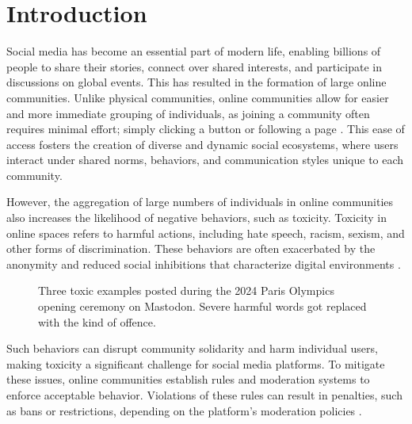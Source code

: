 \chapter{Introduction}\label{introduction}

Social media has become an essential part of modern life, enabling billions of people to share their stories, connect over shared interests, and participate in discussions on global events. This has resulted in the formation of large online communities. Unlike physical communities, online communities allow for easier and more immediate grouping of individuals, as joining a community often requires minimal effort; simply clicking a button or following a page \cite{ellison:2007}. This ease of access fosters the creation of diverse and dynamic social ecosystems, where users interact under shared norms, behaviors, and communication styles unique to each community.

However, the aggregation of large numbers of individuals in online communities also increases the likelihood of negative behaviors, such as toxicity. Toxicity in online spaces refers to harmful actions, including hate speech, racism, sexism, and other forms of discrimination. These behaviors are often exacerbated by the anonymity and reduced social inhibitions that characterize digital environments \cite{suler:2004}.

\begin{figure}[ht]
    \centering
    \caption{Three toxic examples posted during the 2024 Paris Olympics opening ceremony on Mastodon. Severe harmful words got replaced with the kind of offence.}
\end{figure}

Such behaviors can disrupt community solidarity and harm individual users, making toxicity a significant challenge for social media platforms. To mitigate these issues, online communities establish rules and moderation systems to enforce acceptable behavior. Violations of these rules can result in penalties, such as bans or restrictions, depending on the platform's moderation policies \cite{nicholson:2023}.

